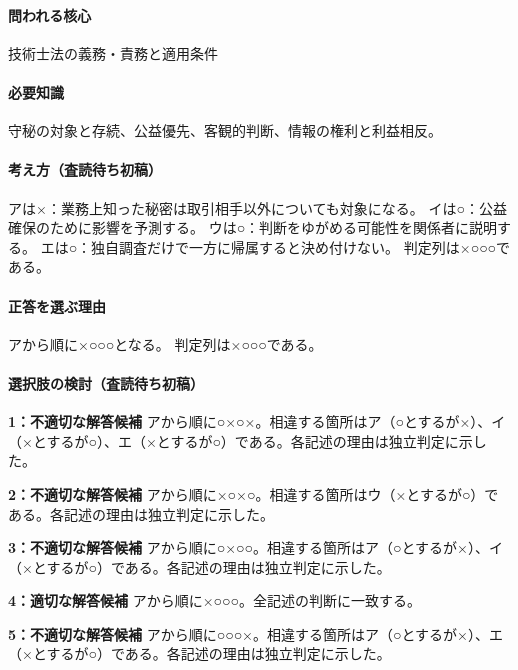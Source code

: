 \paragraph{問われる核心} 技術士法の義務・責務と適用条件

\paragraph{必要知識} 守秘の対象と存続、公益優先、客観的判断、情報の権利と利益相反。

\paragraph{考え方（査読待ち初稿）} アは×：業務上知った秘密は取引相手以外についても対象になる。 イは○：公益確保のために影響を予測する。 ウは○：判断をゆがめる可能性を関係者に説明する。 エは○：独自調査だけで一方に帰属すると決め付けない。 判定列は×○○○である。

\paragraph{正答を選ぶ理由} アから順に×○○○となる。  判定列は×○○○である。

\paragraph{選択肢の検討（査読待ち初稿）}\mbox{}\par

\noindent\textbf{1：不適切な解答候補} アから順に○×○×。相違する箇所はア（○とするが×）、イ（×とするが○）、エ（×とするが○）である。各記述の理由は独立判定に示した。\par

\noindent\textbf{2：不適切な解答候補} アから順に×○×○。相違する箇所はウ（×とするが○）である。各記述の理由は独立判定に示した。\par

\noindent\textbf{3：不適切な解答候補} アから順に○×○○。相違する箇所はア（○とするが×）、イ（×とするが○）である。各記述の理由は独立判定に示した。\par

\noindent\textbf{4：適切な解答候補} アから順に×○○○。全記述の判断に一致する。\par

\noindent\textbf{5：不適切な解答候補} アから順に○○○×。相違する箇所はア（○とするが×）、エ（×とするが○）である。各記述の理由は独立判定に示した。\par

